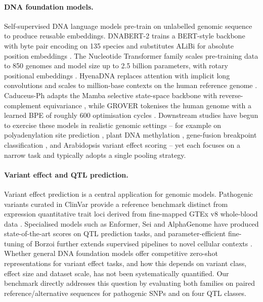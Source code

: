 \documentclass[11pt,a4paper]{article}
\begin{document}
\paragraph{DNA foundation models.}
Self-supervised DNA language models pre-train on unlabelled genomic sequence to produce reusable embeddings. DNABERT-2 trains a BERT-style backbone with byte pair encoding on 135 species and substitutes ALiBi for absolute position embeddings \citep{zhou2024dnabert2}. The Nucleotide Transformer family scales pre-training data to 850 genomes and model size up to 2.5 billion parameters, with rotary positional embeddings \citep{dallatorre2025nt}. HyenaDNA replaces attention with implicit long convolutions \citep{poli2023hyena} and scales to million-base contexts on the human reference genome \citep{nguyen2023hyenadna}. Caduceus-Ph adapts the Mamba selective state-space backbone \citep{gu2023mamba} with reverse-complement equivariance \citep{schiff2024caduceus}, while GROVER tokenises the human genome with a learned BPE of roughly 600 optimisation cycles \citep{sanabria2024grover}. Downstream studies have begun to exercise these models in realistic genomic settings -- for example on polyadenylation site prediction \citep{saha2025polya_glm}, plant DNA methylation \citep{feng2025hyenadna_methylation}, gene-fusion breakpoint classification \citep{krupicka2026fusion}, and Arabidopsis variant effect scoring \citep{benegas2023gpn} -- yet each focuses on a narrow task and typically adopts a single pooling strategy.

\paragraph{Variant effect and QTL prediction.}
Variant effect prediction is a central application for genomic models. Pathogenic variants curated in ClinVar \citep{landrum2018clinvar} provide a reference benchmark distinct from expression quantitative trait loci derived from fine-mapped GTEx v8 whole-blood data \citep{gtex2020}. Specialised models such as Enformer, Sei and AlphaGenome \citep{avsec2021enformer,chen2022sei,avsec2025alphagenome} have produced state-of-the-art scores on QTL prediction tasks, and parameter-efficient fine-tuning of Borzoi further extends supervised pipelines to novel cellular contexts \citep{yuan2026borzoi_peft}. Whether general DNA foundation models offer competitive zero-shot representations for variant effect tasks, and how this depends on variant class, effect size and dataset scale, has not been systematically quantified. Our benchmark directly addresses this question by evaluating both families on paired reference/alternative sequences for pathogenic SNPs and on four QTL classes.
\end{document}
